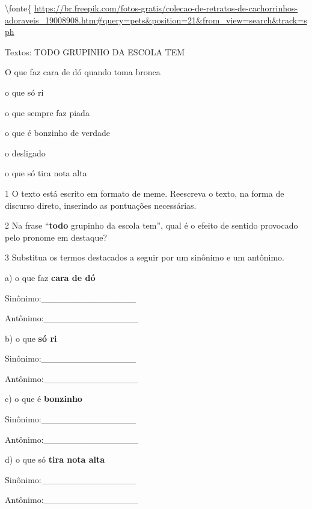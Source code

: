 {\textbackslash fonte\{
\url{https://br.freepik.com/fotos-gratis/colecao-de-retratos-de-cachorrinhos-adoraveis_19008908.htm\#query=pets\&position=21\&from_view=search\&track=sph}

Textos: TODO GRUPINHO DA ESCOLA TEM

O que faz cara de dó quando toma bronca

o que só ri

o que sempre faz piada

o que é bonzinho de verdade

o desligado

o que só tira nota alta

\num{1} O texto está escrito em formato de meme. Reescreva o texto, na
forma de discurso direto, inserindo as pontuações necessárias.



\num{2} Na frase ``\textbf{todo} grupinho da escola tem'', qual é o
efeito de sentido provocado pelo pronome em destaque?



\num{3} Substitua os termos destacados a seguir por um sinônimo e um
antônimo.

a) o que faz \textbf{cara de dó}

Sinônimo:\_\_\_\_\_\_\_\_\_\_\_\_\_\_\_

Antônimo:\_\_\_\_\_\_\_\_\_\_\_\_\_\_\_

b) o que \textbf{só ri}

Sinônimo:\_\_\_\_\_\_\_\_\_\_\_\_\_\_\_

Antônimo:\_\_\_\_\_\_\_\_\_\_\_\_\_\_\_

c) o que é \textbf{bonzinho}

Sinônimo:\_\_\_\_\_\_\_\_\_\_\_\_\_\_\_

Antônimo:\_\_\_\_\_\_\_\_\_\_\_\_\_\_\_

d) o que só \textbf{tira nota alta}

Sinônimo:\_\_\_\_\_\_\_\_\_\_\_\_\_\_\_

Antônimo:\_\_\_\_\_\_\_\_\_\_\_\_\_\_\_

}
